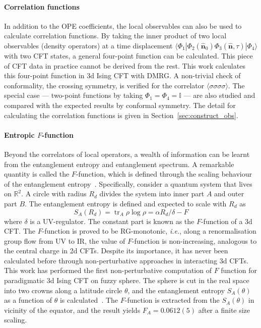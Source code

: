 \documentclass{timesjhep}
\begin{document}
\paragraph{Correlation functions~\cite{Han2023Jun}}

In addition to the OPE coefficients, the local observables can also be used to calculate correlation functions. By taking the inner product of two local observables (density operators) at a time displacement $\langle\Phi_1|\Phi_2(\hat{\mathbf{n}}_0)\Phi_3(\hat{\mathbf{n}},\tau)|\Phi_4\rangle$ with two CFT states, a general four-point function can be calculated. This piece of CFT data in practice cannot be derived from the rest. This work calculates this four-point function in 3d Ising CFT with DMRG. A non-trivial check of conformality, the crossing symmetry, is verified for the correlator $\langle\sigma\sigma\sigma\sigma\rangle$. The special case --- two-point functions by taking $\Phi_1=\Phi_4=\mathbb{I}$ --- are also studied and compared with the expected results by conformal symmetry. The detail for calculating the correlation functions is given in Section~\ref{sec:construct_obs}.

\paragraph{Entropic $F$-function~\cite{Hu2024}}

Beyond the correlators of local operators, a wealth of information can be learnt from the entanglement entropy and entanglement spectrum. A remarkable quantity is called the $F$-function, which is defined through the scaling behaviour of the entanglement entropy~\cite{Myers2010Fthm,Casini2011Fthm,Jafferis2011Fthm,Klebanov2011Fthm,Casini2012Fthm}. Specifically, consider a quantum system that lives on $\mathbb{R}^2$. A circle with radius $R_d$ divides the system into inner part $A$ and outer part $B$. The entanglement entropy is defined and expected to scale with $R_d$ as \begin{equation}
    S_A(R_d)=\operatorname{tr}_A\rho\log\rho=\alpha R_d/\delta-F 
\end{equation}
where $\delta$ is a UV-regulator. The constant part is known as the $F$-function of a 3d CFT. The $F$-function is proved to be RG-monotonic, \textit{i.e.}, along a renormalisation group flow from UV to IR, the value of $F$-function is non-increasing, analogous to the central charge in 2d CFTs. Despite its importance, it has never been calculated before through non-perturbative approaches in interacting 3d CFTs. This work has performed the first non-perturbative computation of $F$ function for paradigmatic 3d Ising CFT on fuzzy sphere. The sphere is cut in the real space into two crowns along a latitude circle $\theta$, and the entanglement entropy $S_A(\theta)$ as a function of $\theta$ is calculated~\cite{Sterdyniak2011RealEnt,Dubail2011RealEnt,Zaletel2012RealEnt,Rodriguez2011RealEnt}. The $F$-function is extracted from the $S_A(\theta)$ in vicinity of the equator, and the result yields $F_A=0.0612(5)$ after a finite size scaling. 
\end{document}
